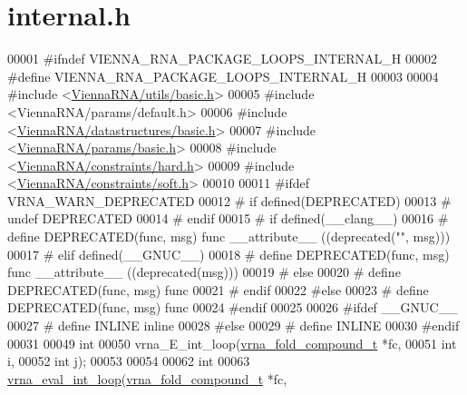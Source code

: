 \hypertarget{internal_8h_source}{}\section{internal.\+h}
\label{internal_8h_source}

\begin{DoxyCode}
00001 \textcolor{preprocessor}{#ifndef VIENNA\_RNA\_PACKAGE\_LOOPS\_INTERNAL\_H}
00002 \textcolor{preprocessor}{#define VIENNA\_RNA\_PACKAGE\_LOOPS\_INTERNAL\_H}
00003 
00004 \textcolor{preprocessor}{#include <\hyperlink{utils_2basic_8h}{ViennaRNA/utils/basic.h}>}
00005 \textcolor{preprocessor}{#include <ViennaRNA/params/default.h>}
00006 \textcolor{preprocessor}{#include <\hyperlink{datastructures_2basic_8h}{ViennaRNA/datastructures/basic.h}>}
00007 \textcolor{preprocessor}{#include <\hyperlink{params_2basic_8h}{ViennaRNA/params/basic.h}>}
00008 \textcolor{preprocessor}{#include <\hyperlink{hard_8h}{ViennaRNA/constraints/hard.h}>}
00009 \textcolor{preprocessor}{#include <\hyperlink{soft_8h}{ViennaRNA/constraints/soft.h}>}
00010 
00011 \textcolor{preprocessor}{#ifdef VRNA\_WARN\_DEPRECATED}
00012 \textcolor{preprocessor}{# if defined(DEPRECATED)}
00013 \textcolor{preprocessor}{#   undef DEPRECATED}
00014 \textcolor{preprocessor}{# endif}
00015 \textcolor{preprocessor}{# if defined(\_\_clang\_\_)}
00016 \textcolor{preprocessor}{#  define DEPRECATED(func, msg) func \_\_attribute\_\_ ((deprecated("", msg)))}
00017 \textcolor{preprocessor}{# elif defined(\_\_GNUC\_\_)}
00018 \textcolor{preprocessor}{#  define DEPRECATED(func, msg) func \_\_attribute\_\_ ((deprecated(msg)))}
00019 \textcolor{preprocessor}{# else}
00020 \textcolor{preprocessor}{#  define DEPRECATED(func, msg) func}
00021 \textcolor{preprocessor}{# endif}
00022 \textcolor{preprocessor}{#else}
00023 \textcolor{preprocessor}{# define DEPRECATED(func, msg) func}
00024 \textcolor{preprocessor}{#endif}
00025 
00026 \textcolor{preprocessor}{#ifdef \_\_GNUC\_\_}
00027 \textcolor{preprocessor}{# define INLINE inline}
00028 \textcolor{preprocessor}{#else}
00029 \textcolor{preprocessor}{# define INLINE}
00030 \textcolor{preprocessor}{#endif}
00031 
00049 \textcolor{keywordtype}{int}
00050 vrna\_E\_int\_loop(\hyperlink{group__fold__compound_structvrna__fc__s}{vrna\_fold\_compound\_t}  *fc,
00051                 \textcolor{keywordtype}{int}                   i,
00052                 \textcolor{keywordtype}{int}                   j);
00053 
00054 
00062 \textcolor{keywordtype}{int}
00063 \hyperlink{group__eval__loops__int_gaab3547bfcdc39d89babbc7ed2a1a4b65}{vrna\_eval\_int\_loop}(\hyperlink{group__fold__compound_structvrna__fc__s}{vrna\_fold\_compound\_t} *fc,

\end{DoxyCode}

